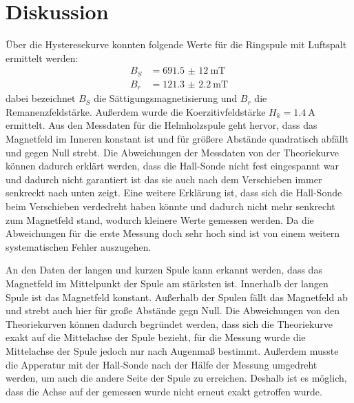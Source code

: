 \section{Diskussion}
Über die Hysteresekurve konnten folgende Werte für die
Ringspule mit Luftspalt ermittelt werden:
\begin{align*}
  B_{S} &=\SI{691,5(12)}{\milli\tesla} \\
  B_{r} &=\SI{121.3(22)}{\milli\tesla}
\end{align*}
\noindent dabei bezeichnet $B_{S}$ die Sättigungsmagnetisierung
und $B_{r}$ die Remanenzfeldstärke. Außerdem wurde die
Koerzitivfeldstärke $H_{k}=\SI{1,4}{\ampere}$
ermittelt.
\noindent Aus den Messdaten für die Helmholzspule geht hervor, dass
das Magnetfeld im Inneren konstant ist und für größere
Abstände quadratisch abfällt und gegen Null strebt.
Die Abweichungen der Messdaten von der Theoriekurve können
dadurch erklärt werden, dass die Hall-Sonde nicht
fest eingespannt war und dadurch nicht garantiert ist
das sie auch nach dem Verschieben immer senkreckt nach
unten zeigt. Eine weitere Erklärung ist, dass sich die
Hall-Sonde beim Verschieben verdedreht haben könnte
und dadurch nicht mehr senkrecht zum Magnetfeld stand, wodurch
kleinere Werte gemessen werden.
\noindent Da die Abweichungen für die erste Messung doch sehr hoch sind
ist von einem weitern systematischen Fehler auszugehen.

\noindent An den Daten der langen und kurzen Spule  kann erkannt
werden, dass das Magnetfeld im Mittelpunkt der Spule am
stärksten ist. Innerhalb der langen Spule ist das
Magnetfeld konstant. Außerhalb der Spulen fällt das
Magnetfeld ab und strebt auch hier für große
Abstände gegn Null.
\noindent Die Abweichungen von den Theoriekurven können dadurch begründet
werden, dass sich die Theoriekurve exakt auf die
Mittelachse der Spule bezieht, für die Messung wurde
die Mittelachse der Spule jedoch nur nach Augenmaß bestimmt.
Außerdem musste die Apperatur mit der Hall-Sonde nach der
Hälfe der Messung umgedreht werden, um auch die andere
Seite der Spule zu erreichen. Deshalb ist es möglich, dass
die Achse auf der gemessen wurde nicht erneut exakt
getroffen wurde.





\label{sec:Diskussion}
